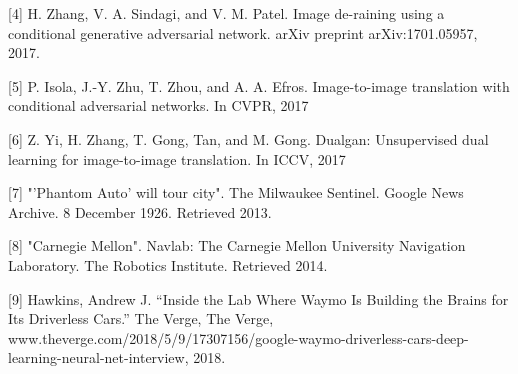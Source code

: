 \documentclass{article}
\begin{document}
\label{[4]}[4] H. Zhang, V. A. Sindagi, and V. M. Patel. Image de-raining using a conditional generative 
adversarial network. arXiv preprint arXiv:1701.05957, 2017.

\label{[5]}[5] P. Isola, J.-Y. Zhu, T. Zhou, and A. A. Efros. 
Image-to-image translation with conditional adversarial networks. 
In CVPR, 2017

\label{[6]}[6] Z. Yi, H. Zhang, T. Gong, Tan, and M. Gong. Dualgan: 
Unsupervised dual learning for image-to-image translation. 
In ICCV, 2017

\label{[7]}[7] "'Phantom Auto' will tour city". The Milwaukee Sentinel. 
Google News Archive. 8 December 1926. Retrieved 2013.

\label{[8]}[8] "Carnegie Mellon". Navlab: The Carnegie Mellon University Navigation Laboratory. 
The Robotics Institute. Retrieved 2014.

\label{[9]}[9] Hawkins, Andrew J. “Inside the Lab Where Waymo Is Building 
the Brains for Its Driverless Cars.” The Verge, The Verge, 
www.theverge.com/2018/5/9/17307156/google-waymo-driverless-cars-deep-learning-neural-net-interview, 2018.


\end{document}
